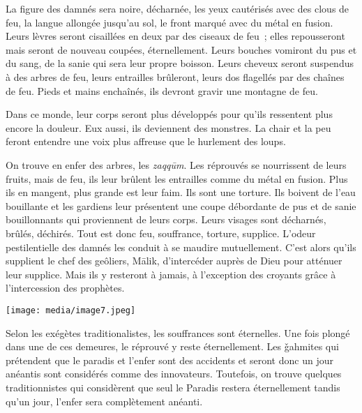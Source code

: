 
La figure des damnés sera noire, décharnée, les yeux cautérisés avec des
clous de feu, la langue allongée jusqu'au sol, le front marqué avec du
métal en fusion. Leurs lèvres seront cisaillées en deux par des ciseaux
de feu~; elles repousseront mais seront de nouveau coupées,
éternellement. Leurs bouches vomiront du pus et du sang, de la sanie qui
sera leur propre boisson. Leurs cheveux seront suspendus à des arbres de
feu, leurs entrailles brûleront, leurs dos flagellés par des chaînes de
feu. Pieds et mains enchaînés, ils devront gravir une montagne de feu.

Dans ce monde, leur corps seront plus développés pour qu'ils ressentent
plus encore la douleur. Eux aussi, ils deviennent des monstres. La chair
et la peu feront entendre une voix plus affreuse que le hurlement des
loups.

On trouve en enfer des arbres, les \emph{zaqqūm}. Les réprouvés se
nourrissent de leurs fruits, mais de feu, ils leur brûlent les
entrailles comme du métal en fusion. Plus ils en mangent, plus grande
est leur faim. Ils sont une torture. Ils boivent de l'eau bouillante et
les gardiens leur présentent une coupe débordante de pus et de sanie
bouillonnants qui proviennent de leurs corps. Leurs visages sont
décharnés, brûlés, déchirés. Tout est donc feu, souffrance, torture,
supplice. L'odeur pestilentielle des damnés les conduit à se maudire
mutuellement. C'est alors qu'ils supplient le chef des geôliers, Mālik,
d'intercéder auprès de Dieu pour atténuer leur supplice. Mais ils y
resteront à jamais, à l'exception des croyants grâce à l'intercession
des prophètes.

\texttt{[image: media/image7.jpeg]}


Selon les exégètes traditionalistes, les souffrances sont éternelles.
Une fois plongé dans une de ces demeures, le réprouvé y reste
éternellement. Les ǧahmites qui prétendent que le paradis et l'enfer
sont des accidents et seront donc un jour anéantis sont considérés comme
des innovateurs. Toutefois, on trouve quelques traditionnistes qui
considèrent que seul le Paradis restera éternellement tandis qu'un jour,
l'enfer sera complètement anéanti.

